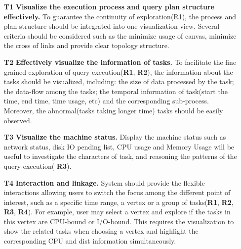 \begin{itemize}
  \item[\textbf{T1}]\textbf{Visualize the execution process and query plan structure effectively.} To guarantee the continuity of exploration(R1), the process and plan structure should be integrated into one visualization view. Several criteria should be considered such as the minimize usage of canvas, minimize the cross of links and provide clear topology structure.
  \item[\textbf{T2}]\textbf{Effectively visualize the information of tasks.} To facilitate the fine grained exploration of query execution(\textbf{R1}, \textbf{R2}), the information about the tasks should be visualized, including: the size of data processed by the task; the data-flow among the tasks; the temporal information of task(start the time, end time, time usage, etc) and the corresponding sub-process. Moreover, the abnormal(tasks taking longer time) tasks should be easily observed.
  \item[\textbf{T3}]\textbf{Visualize the machine status.} Display the machine status such as network status, disk IO pending list, CPU usage and Memory Usage will be useful to investigate the characters of task, and reasoning the patterns of the query execution( \textbf{R3}).
  \item[\textbf{T4}]\textbf{Interaction and linkage.} System should provide the flexible interactions allowing users to switch the focus among the different point of interest, such as a specific time range, a vertex or a group of tasks(\textbf{R1}, \textbf{R2}, \textbf{R3}, \textbf{R4}). For example, user may select a vertex and explore if the tasks in this vertex are CPU-bound or I/O-bound. This requires the visualization to show the related tasks when choosing a vertex and highlight the corresponding CPU and dist information simultaneously.


\end{itemize}
